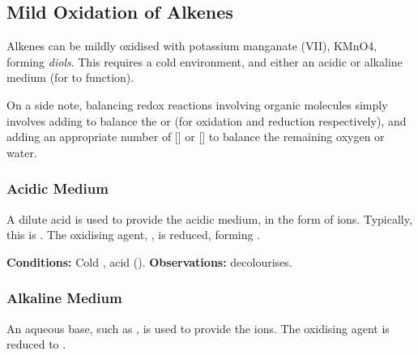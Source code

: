 
	\pagebreak
	\subsection{Mild Oxidation of Alkenes}

		Alkenes can be mildly oxidised with potassium manganate (VII), KMnO4, forming \textit{diols}. This requires a cold environment,
		and either an acidic or alkaline medium (for  to function).

		On a side note, balancing redox reactions involving organic molecules simply involves adding  to balance the
		 or  (for oxidation and reduction respectively), and adding an appropriate number of [] or []
		to balance the remaining oxygen or water.


		\subsubsection{Acidic Medium}

		A dilute acid is used to provide the acidic medium, in the form of  ions. Typically, this is . The oxidising
		agent, , is reduced, forming .

		\vspace{1.5em}
		\vbox{\textbf{Conditions:}	\tabto{35mm}Cold , acid ().}	%
		\vbox{\textbf{Observations:}  decolourises.}





		\subsubsection{Alkaline Medium}

		An aqueous base, such as , is used to provide the  ions. The oxidising agent  is reduced to
		.

